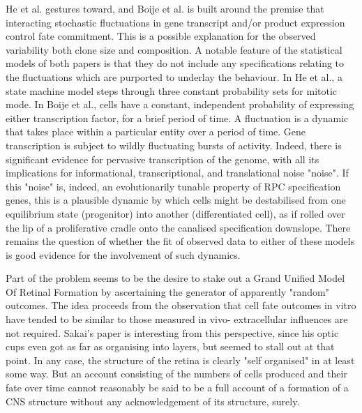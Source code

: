 \documentclass{ut-thesis}
\begin{document}
 He et al. gestures toward, and Boije et al. is built around the premise that interacting stochastic fluctuations in gene transcript and/or product expression control fate commitment. This is a possible explanation for the observed variability both clone size and composition. A notable feature of the statistical models of both papers is that they do not include any specifications relating to the fluctuations which are purported to underlay the behaviour. In He et al., a state machine model steps through three constant probability sets for mitotic mode. In Boije et al., cells have a constant, independent probability of expressing either transcription factor, for a brief period of time. A fluctuation is a dynamic that takes place within a particular entity over a period of time. Gene transcription is subject to wildly fluctuating bursts of activity. Indeed, there is significant evidence for pervasive transcription of the genome, with all its implications for informational, transcriptional, and translational noise "noise". If this "noise" is, indeed, an evolutionarily tunable property of RPC specification genes, this is a plausible dynamic by which cells might be destabilised from one equilibrium state (progenitor) into another (differentiated cell), as if rolled over the lip of a proliferative cradle onto the canalised specification downslope. There remains the question of whether the fit of observed data to either of these models is good evidence for the involvement of such dynamics. 

Part of the problem seems to be the desire to stake out a Grand Unified Model Of Retinal Formation by ascertaining the generator of apparently "random" outcomes. The idea proceeds from the observation that cell fate outcomes in vitro have tended to be similar to those measured in vivo- extracellular influences are not required. Sakai's paper \cite{Nakano2012} is interesting from this perspective, since his optic cups even got as far as organising into layers, but seemed to stall out at that point. In any case, the structure of the retina is clearly "self organised" in at least some way. But an account consisting of the numbers of cells produced and their fate over time cannot reasonably be said to be a full account of a formation of a CNS structure without any acknowledgement of its structure, surely.
\end{document}
